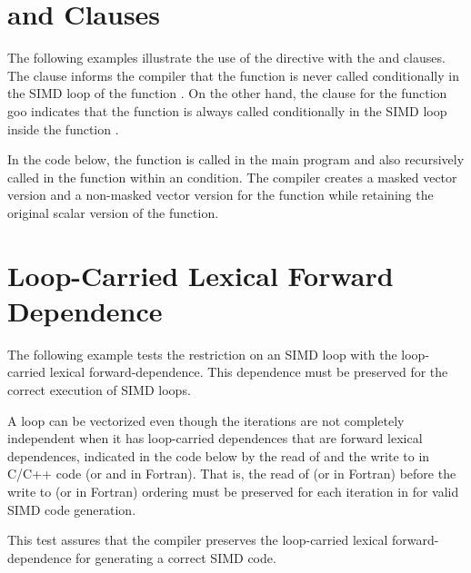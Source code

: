 \section{ and  Clauses}
\label{sec:SIMD_branch}

The following examples illustrate the use of the  
directive with the  and  clauses. The 
 clause informs the compiler that the function  is 
never called conditionally in the SIMD loop of the function . On 
the other hand, the  clause for the function goo indicates that 
the function is always called conditionally in the SIMD loop inside 
the function .




In the code below, the function  is called in the main program and 
also recursively called in the function  within an  
condition. The compiler creates a masked vector version and a non-masked vector 
version for the function  while retaining the original scalar 
version of the  function.





\section{Loop-Carried Lexical Forward Dependence}
\label{sec:SIMD_forward_dep}


 The following example tests the restriction on an SIMD loop with the loop-carried lexical forward-dependence. This dependence must be preserved for the correct execution of SIMD loops.

A loop can be vectorized even though the iterations are not completely independent when it has loop-carried dependences that are forward lexical dependences, indicated in the code below by the read of  and the write to  in C/C++ code (or  and  in Fortran). That is, the read of  (or  in Fortran) before the write to  (or  in Fortran) ordering must be preserved for each iteration in  for valid SIMD code generation.

This test assures that the compiler preserves the loop-carried lexical forward-dependence for generating a correct SIMD code.



